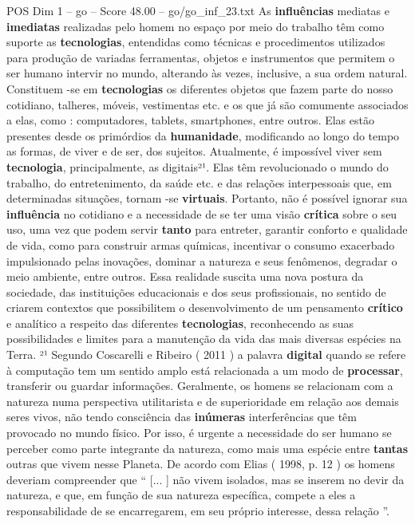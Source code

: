\begin{textsample}{POS Dim 1 – go – Score 48.00 – go/go\_inf\_23.txt}
As \textbf{influências} mediatas e \textbf{imediatas} realizadas pelo homem no espaço por meio do trabalho têm como suporte as \textbf{tecnologias}, entendidas como técnicas e procedimentos utilizados para produção de variadas ferramentas, objetos e instrumentos que permitem o ser humano intervir no mundo, alterando às vezes, inclusive, a sua ordem natural.
Constituem -se em \textbf{tecnologias} os diferentes objetos que fazem parte do nosso cotidiano, talheres, móveis, vestimentas etc. e os que já são comumente associados a elas, como : computadores, tablets, smartphones, entre outros.
Elas estão presentes desde os primórdios da \textbf{humanidade}, modificando ao longo do tempo as formas, de viver e de ser, dos sujeitos.
Atualmente, é impossível viver sem \textbf{tecnologia}, principalmente, as digitais²¹.
Elas têm revolucionado o mundo do trabalho, do entretenimento, da saúde etc. e das relações interpessoais que, em determinadas situações, tornam -se \textbf{virtuais}.
Portanto, não é possível ignorar sua \textbf{influência} no cotidiano e a necessidade de se ter uma visão \textbf{crítica} sobre o seu uso, uma vez que podem servir \textbf{tanto} para entreter, garantir conforto e qualidade de vida, como para construir armas químicas, incentivar o consumo exacerbado impulsionado pelas inovações, dominar a natureza e seus fenômenos, degradar o meio ambiente, entre outros.
Essa realidade suscita uma nova postura da sociedade, das instituições educacionais e dos seus profissionais, no sentido de criarem contextos que possibilitem o desenvolvimento de um pensamento \textbf{crítico} e analítico a respeito das diferentes \textbf{tecnologias}, reconhecendo as suas possibilidades e limites para a manutenção da vida das mais diversas espécies na Terra. ²¹ Segundo Coscarelli e Ribeiro ( 2011 ) a palavra \textbf{digital} quando se refere à computação tem um sentido amplo está relacionada a um modo de \textbf{processar}, transferir ou guardar informações.
Geralmente, os homens se relacionam com a natureza numa perspectiva utilitarista e de superioridade em relação aos demais seres vivos, não tendo consciência das \textbf{inúmeras} interferências que têm provocado no mundo físico.
Por isso, é urgente a necessidade do ser humano se perceber como parte integrante da natureza, como mais uma espécie entre \textbf{tantas} outras que vivem nesse Planeta.
De acordo com Elias ( 1998, p. 12 ) os homens deveriam compreender que “ [... ] não vivem isolados, mas se inserem no devir da natureza, e que, em função de sua natureza específica, compete a eles a responsabilidade de se encarregarem, em seu próprio interesse, dessa relação ”.

\end{textsample}
